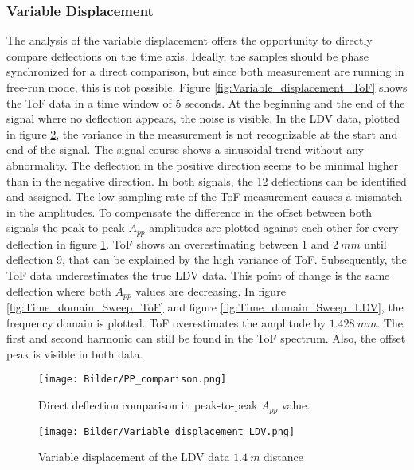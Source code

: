 \newpage
\subsubsection{Variable Displacement}

The analysis of the variable displacement offers the opportunity to directly compare deflections on the time axis. Ideally, the samples should be phase synchronized for a direct comparison, but since both measurement are running in free-run mode, this is not possible. Figure \ref{fig:Variable_displacement_ToF} shows the ToF data in a time window of 5 seconds. At the beginning and the end of the signal where no deflection appears, the noise is visible. In the LDV data, plotted in figure \ref{fig:Variable_displacement_LDV}, the variance in the measurement is not recognizable at the start and end of the signal. The signal course shows a sinusoidal trend without any abnormality. The deflection in the positive direction seems to be minimal higher than in the negative direction. In both signals, the 12 deflections can be identified and assigned. The low sampling rate of the ToF measurement causes a mismatch in the amplitudes. To compensate the difference in the offset between both signals the peak-to-peak $A_{pp}$ amplitudes are plotted against each other for every deflection in figure \ref{fig:displacement_comparision}. ToF shows an overestimating between $1$ and $2~mm$ until deflection 9, that can be explained by the high variance of ToF. Subsequently, the ToF data underestimates the true LDV data. This point of change is the same deflection where both $A_{pp}$ values are decreasing. In figure \ref{fig:Time_domain_Sweep_ToF} and figure \ref{fig:Time_domain_Sweep_LDV}, the frequency domain is plotted. ToF overestimates the amplitude by $1.428~mm$. The first and second harmonic can still be found in the ToF spectrum. Also, the offset peak is visible in both data.
 
\begin{figure}[!h]  
	\centering
	\texttt{[image: Bilder/PP\_comparison.png]}
	\caption{Direct deflection comparison in peak-to-peak $A_{pp}$ value. }
	\label{fig:displacement_comparision}
\end{figure}

\newpage

\begin{figure}[!h]  
	\centering
	\texttt{[image: Bilder/Variable\_displacement\_LDV.png]}
	\caption{Variable displacement of the LDV data $1.4~m$ distance}
	\label{fig:Variable_displacement_LDV}
\end{figure}



